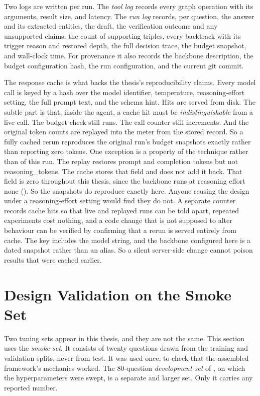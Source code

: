 Two logs are written per run. The \emph{tool log} records every graph operation
with its arguments, result size, and latency. The \emph{run log} records, per
question, the answer and its extracted entities, the draft, the verification
outcome and any unsupported claims, the count of supporting triples, every
backtrack with its trigger reason and restored depth, the full decision trace,
the budget snapshot, and wall-clock time. For provenance it also records the
backbone description, the budget configuration hash, the run configuration, and
the current git commit.

The response cache is what backs the thesis's reproducibility claims. Every
model call is keyed by a hash over the model identifier, temperature,
reasoning-effort setting, the full prompt text, and the schema hint. Hits are
served from disk. The subtle part is that, inside the agent, a cache hit must be
\emph{indistinguishable} from a live call. The budget check still runs. The call
counter still increments. And the original token counts are replayed into the
meter from the stored record. So a fully cached rerun reproduces the original
run's budget snapshots exactly rather than reporting zero tokens. One exception
is a property of the technique rather than of this run. The replay restores
prompt and completion tokens but not \textsf{reasoning\_tokens}. The cache
stores that field and does not add it back. That field is zero throughout this
thesis, since the backbone runs at reasoning effort \textsf{none}
(). So the snapshots do reproduce exactly here. Anyone
reusing the design under a reasoning-effort setting would find they do not. A
separate counter records cache hits so that live and replayed runs can be told
apart, repeated experiments cost nothing, and a code change that is not supposed
to alter behaviour can be verified by confirming that a rerun is served entirely
from cache. The key includes the model string, and the backbone configured here
is a dated snapshot rather than an alias. So a silent server-side change cannot
poison results that were cached earlier.

\section{Design Validation on the Smoke Set}\label{sec:design-validation}

Two tuning sets appear in this thesis, and they are not the same. This section
uses the \emph{smoke set}. It consists of twenty questions drawn from the
training and validation splits, never from test. It was used once, to check that
the assembled framework's mechanics worked. The $80$-question \emph{development
set} of , on which the hyperparameters were swept, is
a separate and larger set. Only it carries any reported number.

